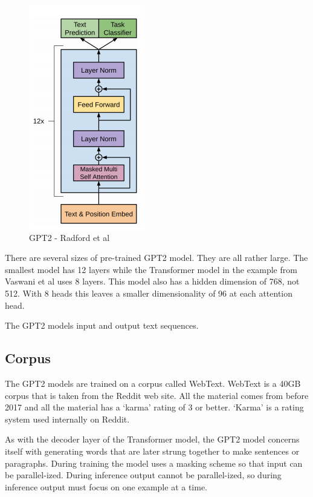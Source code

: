 \begin{figure}[H]
	\begin{center}
		
		
		\includegraphics[scale=3.0]{diagram-mat05}
	\end{center}
	\caption[Generative Pre-training Transformer 2 ]{GPT2 - Radford et al \cite{radford2018improving}}
	

\end{figure}

There are several sizes of pre-trained GPT2 model. They are all rather large. The smallest model has 12 layers while the Transformer model in the example from Vaswani et al \cite{Vaswani2017AttentionIA} uses 8 layers. This model also has a hidden dimension of 768, not 512. With 8 heads this leaves a smaller dimensionality of 96 at each attention head. 

The GPT2 models input and output text sequences. %

\subsection{Corpus}
The GPT2 models are trained on a corpus called WebText. WebText is a 40GB corpus that is taken from the Reddit web site. All the material comes from before 2017 and all the material has a `karma' rating of 3 or better. `Karma' is a rating system used internally on Reddit. 

As with the decoder layer of the Transformer model, the GPT2 model concerns itself with generating words that are later strung together to make sentences or paragraphs. During training the model uses a masking scheme so that input can be parallel-ized. During inference output cannot be parallel-ized, so during inference output must focus on one example at a time.

